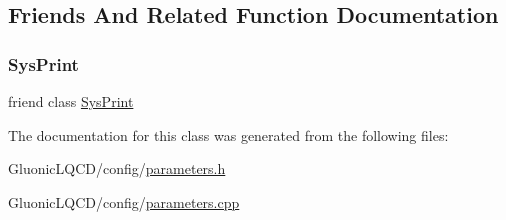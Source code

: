 \subsection{Friends And Related Function Documentation}
\mbox{\label{class_parameters_aa0fdc1e103aea3a32f97ca2009dda3e6}} 
\subsubsection{\texorpdfstring{SysPrint}{SysPrint}}
{\footnotesize\ttfamily friend class \mbox{\hyperlink{class_sys_print}{Sys\+Print}}\hspace{0.3cm}{\ttfamily [friend]}}



The documentation for this class was generated from the following files\+:\begin{DoxyCompactItemize}
\item 
Gluonic\+L\+Q\+C\+D/config/\mbox{\hyperlink{parameters_8h}{parameters.\+h}}\item 
Gluonic\+L\+Q\+C\+D/config/\mbox{\hyperlink{parameters_8cpp}{parameters.\+cpp}}\end{DoxyCompactItemize}
